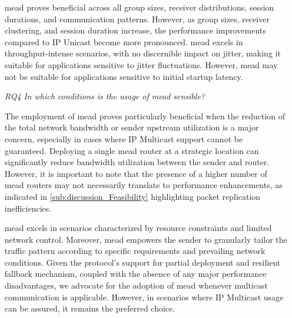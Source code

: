 \begin{itemize}
    \gls{mead} proves beneficial across all group sizes, receiver distributions,
        session durations, and communication patterns.
    However, as group sizes, receiver clustering, and session duration
        increase, the performance improvements compared to IP Unicast become
        more pronounced.
    \gls{mead} excels in throughput-intense scenarios, with no discernible impact
        on jitter, making it suitable for applications sensitive to jitter
        fluctuations.
    However, \gls{mead} may not be suitable for applications sensitive to initial
        startup latency.

\item[\textit{RQ4}]
    \textit{In which conditions is the usage of \gls{mead} sensible?}

    The employment of \gls{mead} proves particularly beneficial when the
        reduction of the total network bandwidth or sender upstream utilization
        is a major concern, especially in cases where IP Multicast support
        cannot be guaranteed.
    Deploying a single \gls{mead} router at a strategic location can
        significantly reduce bandwidth utilization between the sender and
        router.
    However, it is important to note that the presence of a higher number of
        \gls{mead} routers may not necessarily translate to performance
        enhancements, as indicated in \autoref{sub:discussion_Feasibility}
        highlighting packet replication inefficiencies.

    \gls{mead} excels in scenarios characterized by resource constraints and
        limited network control.
    Moreover, \gls{mead} empowers the sender to granularly tailor the traffic
        pattern according to specific requirements and prevailing network
        conditions.
    Given the protocol's support for partial deployment and resilient fallback
        mechanism, coupled with the absence of any major performance
        disadvantages, we advocate for the adoption of \gls{mead} whenever
        multicast communication is applicable.
    However, in scenarios where IP Multicast usage can be assured, it remains
        the preferred choice.

\end{itemize}

